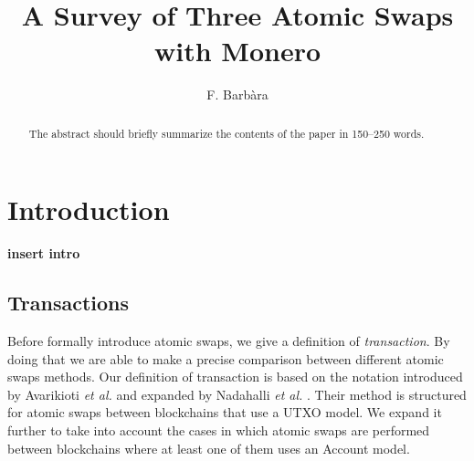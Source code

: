 \documentclass[runningheads]{llncs}
\newcommand{\etal}{\textit{et al. }}
\begin{document}
%
\title{A Survey of Three Atomic Swaps with Monero}
%
%
\author{F. Barb\`ara}
%
%
%
\maketitle              %
%
\begin{abstract}
The abstract should briefly summarize the contents of the paper in
150--250 words.

\end{abstract}
%
%
%
\section{Introduction}
\label{sec_introduction}
\textbf{insert intro}


\subsection{Transactions}
\label{sec_transactions}
Before formally introduce atomic swaps, we give a definition of \emph{transaction}. By doing that we are able to make a precise comparison between different atomic swaps methods. Our definition of transaction is based on the notation introduced by Avarikioti \etal \cite{avarikioti19cerberus} and expanded by Nadahalli \etal \cite{nadahalli22grieffreeas}. Their method is structured for atomic swaps between blockchains that use a UTXO model. We expand it further to take into account the cases in which atomic swaps are performed between blockchains where at least one of them uses an Account model.
\end{document}
